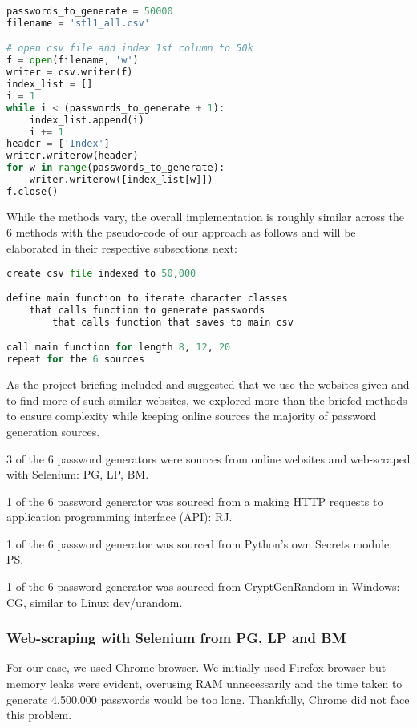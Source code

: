 \documentclass[letterpaper,twocolumn,10pt]{article}
\begin{document}
\begin{lstlisting}[language=python, frame=none]
passwords_to_generate = 50000
filename = 'stl1_all.csv'

# open csv file and index 1st column to 50k
f = open(filename, 'w')
writer = csv.writer(f)
index_list = []
i = 1
while i < (passwords_to_generate + 1):
    index_list.append(i)
    i += 1
header = ['Index']
writer.writerow(header)
for w in range(passwords_to_generate):
    writer.writerow([index_list[w]])
f.close() 
\end{lstlisting}

While the methods vary, the overall implementation is roughly similar across the 6 methods with the pseudo-code of our approach as follows and will be elaborated in their respective subsections next:

\begin{lstlisting}[language=python, frame=none]
create csv file indexed to 50,000

define main function to iterate character classes
    that calls function to generate passwords
        that calls function that saves to main csv

call main function for length 8, 12, 20
repeat for the 6 sources
\end{lstlisting}

As the project briefing included and suggested that we use the websites given and to find more of such similar websites, we explored more than the briefed methods to ensure complexity while keeping online sources the majority of password generation sources. 

3 of the 6 password generators were sources from online websites and web-scraped with Selenium: PG, LP, BM. 

1 of the 6 password generator was sourced from a making HTTP requests to application programming interface (API): RJ. 

1 of the 6 password generator was sourced from Python's own Secrets module: PS.

1 of the 6 password generator was sourced from CryptGenRandom in Windows: CG, similar to Linux dev/urandom.

\subsubsection{Web-scraping with Selenium from PG, LP and BM}
For our case, we used Chrome browser. We initially used Firefox browser but memory leaks were evident, overusing RAM unnecessarily\cite{selram} and the time taken to generate 4,500,000 passwords would be too long. Thankfully, Chrome did not face this problem.
\end{document}
